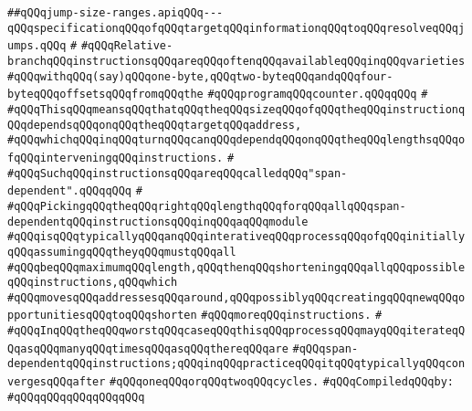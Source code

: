 \label{src/lib/compiler/back/low/jmp/jump-size-ranges.api}
\verb|##qQQqjump-size-ranges.apiqQQq---qQQqspecificationqQQqofqQQqtargetqQQqinformationqQQqtoqQQqresolveqQQqjumps.qQQq|\newline
\verb|#|\newline
\verb|#qQQqRelative-branchqQQqinstructionsqQQqareqQQqoftenqQQqavailableqQQqinqQQqvarieties|\newline
\verb|#qQQqwithqQQq(say)qQQqone-byte,qQQqtwo-byteqQQqandqQQqfour-byteqQQqoffsetsqQQqfromqQQqthe|\newline
\verb|#qQQqprogramqQQqcounter.qQQqqQQq|\newline
\verb|#|\newline
\verb|#qQQqThisqQQqmeansqQQqthatqQQqtheqQQqsizeqQQqofqQQqtheqQQqinstructionqQQqdependsqQQqonqQQqtheqQQqtargetqQQqaddress,|\newline
\verb|#qQQqwhichqQQqinqQQqturnqQQqcanqQQqdependqQQqonqQQqtheqQQqlengthsqQQqofqQQqinterveningqQQqinstructions.|\newline
\verb|#|\newline
\verb|#qQQqSuchqQQqinstructionsqQQqareqQQqcalledqQQq"span-dependent".qQQqqQQq|\newline
\verb|#|\newline
\verb|#qQQqPickingqQQqtheqQQqrightqQQqlengthqQQqforqQQqallqQQqspan-dependentqQQqinstructionsqQQqinqQQqaqQQqmodule|\newline
\verb|#qQQqisqQQqtypicallyqQQqanqQQqinterativeqQQqprocessqQQqofqQQqinitiallyqQQqassumingqQQqtheyqQQqmustqQQqall|\newline
\verb|#qQQqbeqQQqmaximumqQQqlength,qQQqthenqQQqshorteningqQQqallqQQqpossibleqQQqinstructions,qQQqwhich|\newline
\verb|#qQQqmovesqQQqaddressesqQQqaround,qQQqpossiblyqQQqcreatingqQQqnewqQQqopportunitiesqQQqtoqQQqshorten|\newline
\verb|#qQQqmoreqQQqinstructions.|\newline
\verb|#|\newline
\verb|#qQQqInqQQqtheqQQqworstqQQqcaseqQQqthisqQQqprocessqQQqmayqQQqiterateqQQqasqQQqmanyqQQqtimesqQQqasqQQqthereqQQqare|\newline
\verb|#qQQqspan-dependentqQQqinstructions;qQQqinqQQqpracticeqQQqitqQQqtypicallyqQQqconvergesqQQqafter|\newline
\verb|#qQQqoneqQQqorqQQqtwoqQQqcycles.|\newline
\newline
\verb|#qQQqCompiledqQQqby:|\newline
\verb|#qQQqqQQqqQQqqQQqqQQq|\newline
